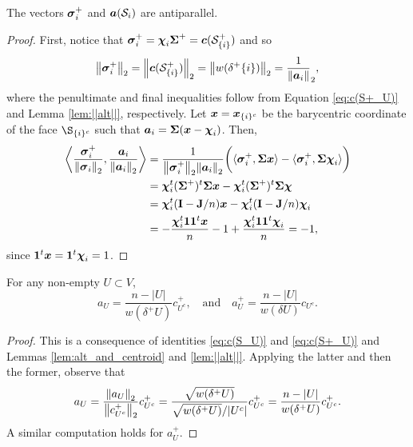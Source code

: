 \begin{lemma}
\label{lem:svi^+ai_parallel}
The vectors $\vb*{\sigma}_i^+$ and $\vb*{a}(\mathcal{S}_i)$ are antiparallel. 
\end{lemma}
\begin{proof}
First, notice that $\vb*{\sigma}_i^+=\boldsymbol{\chi}_i \boldsymbol{\Sigma}^+=\vb*{c}(\mathcal{S}^+_{\{i\}})$ and so \begin{equation*}
    \norm{\vb*{\sigma}_i^+}_2 = \norm{\vb*{c}(\mathcal{S}^+_{\{i\}})}_2 = \norm{ w(\delta^+ \{i\})}_2 = \frac{1}{\norm{\vb*{a}_i}}_2,
\end{equation*}
where the penultimate and final inequalities follow from Equation \eqref{eq:c(S+_U)} and Lemma \ref{lem:||alt||}, respectively. Let $\vb*{x}=\vb*{x}_{\{i\}^c}$ be the barycentric coordinate of the face $\S_{\{i\}^c}$ such that $\vb*{a}_i = \boldsymbol{\Sigma}(\vb*{x}-\boldsymbol{\chi}_i)$. Then, 
\begin{align*}
    \bigg\langle \frac{\vb*{\sigma}_i^+}{\norm{\vb*{\sigma}_i}_2},\frac{\vb*{a}_i}{\norm{\vb*{a}_i}_2}\bigg \rangle 
    &= \frac{1}{\norm{\vb*{\sigma}^+_i}_2\norm{\vb*{a}_i}_2} \bigg( \langle \vb*{\sigma}_i^+,\boldsymbol{\Sigma}\vb*{x}\rangle - \langle \vb*{\sigma}_i^+,\boldsymbol{\Sigma}\boldsymbol{\chi}_i\rangle \bigg) \\
    &= \boldsymbol{\chi}_i^t (\boldsymbol{\Sigma}^+)^t \boldsymbol{\Sigma} \vb*{x} - \boldsymbol{\chi}_i^t (\boldsymbol{\Sigma}^+)^t \boldsymbol{\Sigma}\boldsymbol{\chi} \\
    &= \boldsymbol{\chi}_i^t (\vb{I}-\vb{J}/n) \vb*{x} - \boldsymbol{\chi}_i^t(\vb{I}-\vb{J}/n) \boldsymbol{\chi}_i \\
    &= - \frac{\boldsymbol{\chi}_i^t \vb{1}\vb{1}^t \vb*{x} }{n} - 1 + \frac{\boldsymbol{\chi}_i^t \vb{1}\vb{1}^t \boldsymbol{\chi}_i}{n}=-1,
\end{align*}
since $\vb{1}^t \vb*{x}=\vb{1}^t \boldsymbol{\chi}_i=1$. 
\end{proof}

\begin{lemma}
\label{lem:alt}
For any non-empty $U\subset V$, 
\[a_U=\frac{n-|U|}{w(\delta^+ U)}c^+_{U^c},\quad \text{and}\quad a^+_U = \frac{n-|U|}{w(\delta U)} c_{U^c}.\]
\end{lemma}
\begin{proof}
This is a consequence of identities \eqref{eq:c(S_U)} and \eqref{eq:c(S+_U)} and Lemmas \ref{lem:alt_and_centroid} and \ref{lem:||alt||}. Applying the latter and then the former, observe that 
\[a_U = \frac{\norm{a_U}_2}{\norm{c^+_{U^c}}_2}c^+_{U^c} = \frac{\sqrt{w(\delta^+ U)}}{\sqrt{w(\delta^+U)}/|U^c|}c^+_{U^c} = \frac{n-|U|}{w(\delta^+U)}c^+_{U^c}.\]
A similar computation holds for $a_U^+$.  
\end{proof}


